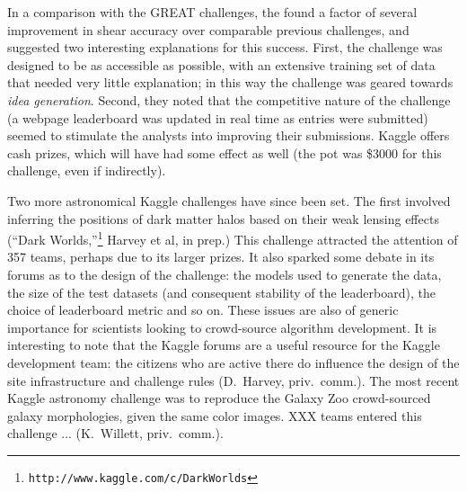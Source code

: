 \documentclass{ar2e}
\begin{document}
In a comparison with the GREAT challenges, the \citeauthor{KitchingEtal2013b}
found a factor of several improvement in shear accuracy over comparable previous
challenges, and suggested two interesting explanations for this success. First,
the challenge was designed to be as accessible as possible, with an extensive
training set of data that needed very little explanation; in this way the
challenge was geared towards {\it idea generation}. Second, they noted that the
competitive  nature of the challenge (a webpage leaderboard was updated in real
time as entries were submitted) seemed to stimulate the analysts into improving
their submissions. Kaggle offers cash prizes, which will have had some effect as
well (the pot was \$3000 for this challenge, even if indirectly).

Two more astronomical Kaggle challenges have since been set. The first involved
inferring the positions of dark matter halos based on their weak lensing effects
(``Dark Worlds,''\footnote{\texttt{http://www.kaggle.com/c/DarkWorlds}} Harvey
et al, in prep.) This challenge attracted the attention of 357 teams, perhaps
due to its larger prizes. It also sparked some debate in its forums as to the
design of the challenge: the models used to generate the data, the size of the
test datasets (and consequent stability of the leaderboard),  the choice of
leaderboard metric and so on. These issues are also of generic importance for
scientists looking to crowd-source algorithm development. It is interesting to
note that the Kaggle forums are a useful resource for the Kaggle development
team: the citizens who are active there do influence the design of the site
infrastructure and challenge rules (D.~Harvey, priv.~comm.). The most recent
Kaggle astronomy challenge was to reproduce the Galaxy Zoo crowd-sourced galaxy
morphologies, given the same color images. XXX teams entered this challenge ...
(K.\ Willett, priv.\ comm.).



% 
\end{document}
